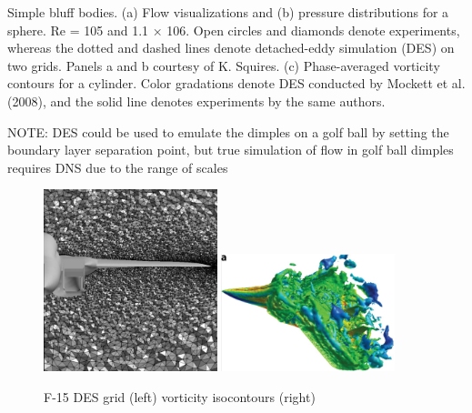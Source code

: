 \documentclass[journal]{new-aiaa}
\begin{document}
Simple bluff bodies. (a) Flow visualizations and (b) pressure distributions for a sphere. Re = 105 and 1.1 × 106. Open circles and
diamonds denote experiments, whereas the dotted and dashed lines denote detached-eddy simulation (DES) on two grids. Panels a and
b courtesy of K. Squires. (c) Phase-averaged vorticity contours for a cylinder. Color gradations denote DES conducted by Mockett et al.
(2008), and the solid line denotes experiments by the same authors.

NOTE: DES could be used to emulate the dimples on a golf ball by setting the boundary layer separation point, but true simulation of flow in golf ball dimples requires DNS due to the range of scales










\begin{figure}[H]
\begin{center}
\includegraphics[width=0.45\textwidth]{Images/logan/forsythe2004detachededdy_f15grid.pdf}
\includegraphics[width=0.45\textwidth]{Images/logan/spalart2009detachededdy_f15des.pdf}
\caption{ F-15 DES grid (left) \cite{forsythe2004detachededdy} vorticity isocontours (right) \cite{spalart2009detachededdy} }
\label{fig:f15des}
\end{center}
\end{figure}
\end{document}
